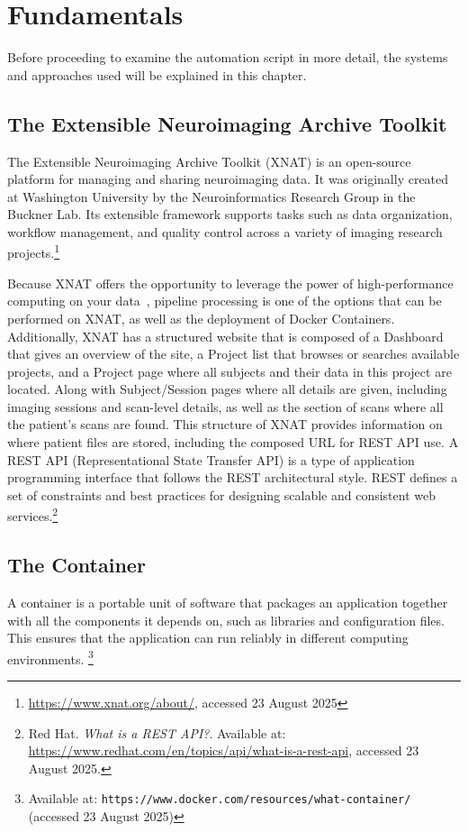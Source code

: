 
\chapter{Fundamentals}

Before proceeding to examine the automation script in more detail, the systems and approaches used will be explained in this chapter.

\section{The Extensible Neuroimaging Archive Toolkit}
The Extensible Neuroimaging Archive Toolkit (XNAT) is an open-source platform for managing and sharing neuroimaging data. It was originally created at Washington University by the Neuroinformatics Research Group in the Buckner Lab. Its extensible framework supports tasks such as data organization, workflow management, and quality control across a variety of imaging research projects.\footnote{\url{https://www.xnat.org/about/}, accessed 23 August 2025}

Because XNAT offers the opportunity to leverage the power of high-performance computing on your data~\cite{zaschke_extending_2024}, 
pipeline processing is one of the options that can be performed on XNAT, as well as the deployment of Docker Containers.
\\
Additionally, XNAT has a structured website that is composed of a Dashboard that gives an overview of the site, a Project list that browses or searches available projects, and a Project page where all subjects and their data in this project are located. Along with Subject/Session pages where all details are given, including imaging sessions and scan-level details, as well as the section of scans where all the patient’s scans are found. 
This structure of XNAT provides information on where patient files are stored, including the composed URL for REST API use. A REST API (Representational State Transfer API) is a type of application programming interface that follows the REST architectural style. REST defines a set of constraints and best practices for designing scalable and consistent web services.\footnote{Red Hat. \textit{What is a REST API?}. Available at: \url{https://www.redhat.com/en/topics/api/what-is-a-rest-api}, accessed 23 August 2025.}

\section{The Container} 
A container is a portable unit of software that packages an application together with all the components it depends on, such as libraries and configuration files. This ensures that the application can run reliably in different computing environments. \footnote{Available at: \texttt{https://www.docker.com/resources/what-container/} (accessed 23 August 2025)}

